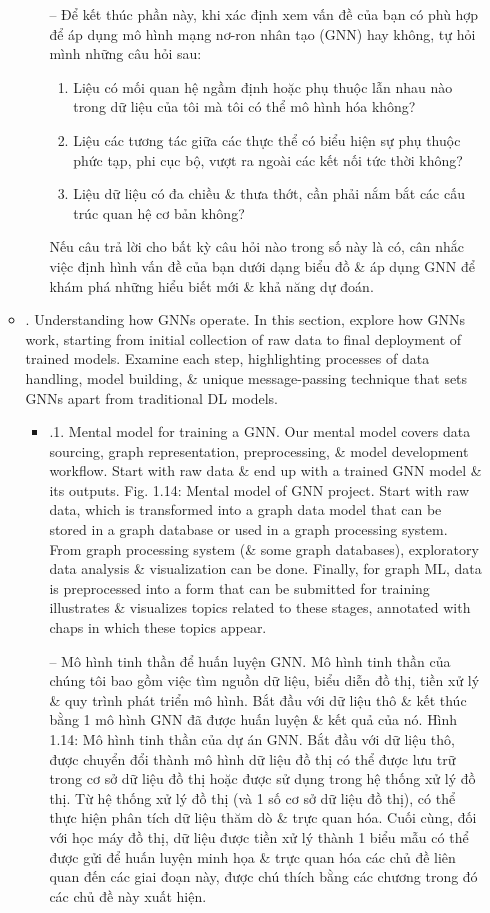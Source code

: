 \documentclass{article}
\begin{document}
\begin{itemize}
\begin{itemize}
\begin{itemize}
            -- Để kết thúc phần này, khi xác định xem vấn đề của bạn có phù hợp để áp dụng mô hình mạng nơ-ron nhân tạo (GNN) hay không, tự hỏi mình những câu hỏi sau:
            \begin{enumerate}
                \item Liệu có mối quan hệ ngầm định hoặc phụ thuộc lẫn nhau nào trong dữ liệu của tôi mà tôi có thể mô hình hóa không?
                \item Liệu các tương tác giữa các thực thể có biểu hiện sự phụ thuộc phức tạp, phi cục bộ, vượt ra ngoài các kết nối tức thời không?
                \item Liệu dữ liệu có đa chiều \& thưa thớt, cần phải nắm bắt các cấu trúc quan hệ cơ bản không?
            \end{enumerate}
            Nếu câu trả lời cho bất kỳ câu hỏi nào trong số này là có, cân nhắc việc định hình vấn đề của bạn dưới dạng biểu đồ \& áp dụng GNN để khám phá những hiểu biết mới \& khả năng dự đoán.
        \end{itemize}
        \item {. Understanding how GNNs operate.} In this section, explore how GNNs work, starting from initial collection of raw data to final deployment of trained models. Examine each step, highlighting processes of data handling, model building, \& unique message-passing technique that sets GNNs apart from traditional DL models.
        \begin{itemize}
            \item {.1. Mental model for training a GNN.} Our mental model covers data sourcing, graph representation, preprocessing, \& model development workflow. Start with raw data \& end up with a trained GNN model \& its outputs. {\sf Fig. 1.14: Mental model of GNN project. Start with raw data, which is transformed into a graph data model that can be stored in a graph database or used in a graph processing system. From graph processing system (\& some graph databases), exploratory data analysis \& visualization can be done. Finally, for graph ML, data is preprocessed into a form that can be submitted for training} illustrates \& visualizes topics related to these stages, annotated with chaps in which these topics appear.

            -- {\sf Mô hình tinh thần để huấn luyện GNN.} Mô hình tinh thần của chúng tôi bao gồm việc tìm nguồn dữ liệu, biểu diễn đồ thị, tiền xử lý \& quy trình phát triển mô hình. Bắt đầu với dữ liệu thô \& kết thúc bằng 1 mô hình GNN đã được huấn luyện \& kết quả của nó. {\sf Hình 1.14: Mô hình tinh thần của dự án GNN. Bắt đầu với dữ liệu thô, được chuyển đổi thành mô hình dữ liệu đồ thị có thể được lưu trữ trong cơ sở dữ liệu đồ thị hoặc được sử dụng trong hệ thống xử lý đồ thị. Từ hệ thống xử lý đồ thị (và 1 số cơ sở dữ liệu đồ thị), có thể thực hiện phân tích dữ liệu thăm dò \& trực quan hóa. Cuối cùng, đối với học máy đồ thị, dữ liệu được tiền xử lý thành 1 biểu mẫu có thể được gửi để huấn luyện} minh họa \& trực quan hóa các chủ đề liên quan đến các giai đoạn này, được chú thích bằng các chương trong đó các chủ đề này xuất hiện.


\end{itemize}
\end{itemize}
\end{itemize}
\end{document}
